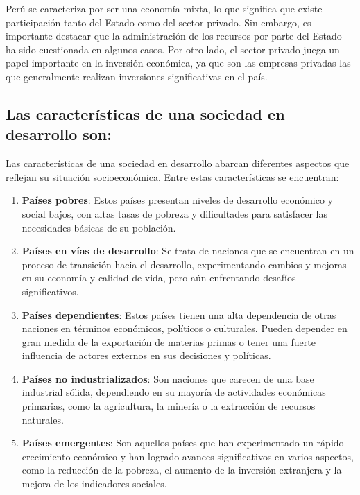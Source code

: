 \documentclass[
  a4paper,
]{article}
\begin{document}
Perú se caracteriza por ser una economía mixta, lo que significa que
existe participación tanto del Estado como del sector privado. Sin
embargo, es importante destacar que la administración de los recursos
por parte del Estado ha sido cuestionada en algunos casos. Por otro
lado, el sector privado juega un papel importante en la inversión
económica, ya que son las empresas privadas las que generalmente
realizan inversiones significativas en el país.

\subsection{Las características de una sociedad en desarrollo
son:}\label{las-caracteruxedsticas-de-una-sociedad-en-desarrollo-son}

Las características de una sociedad en desarrollo abarcan diferentes
aspectos que reflejan su situación socioeconómica. Entre estas
características se encuentran:

\begin{enumerate}
\def\labelenumi{\arabic{enumi}.}
\item
  \textbf{Países pobres}: Estos países presentan niveles de desarrollo
  económico y social bajos, con altas tasas de pobreza y dificultades
  para satisfacer las necesidades básicas de su población.
\item
  \textbf{Países en vías de desarrollo}: Se trata de naciones que se
  encuentran en un proceso de transición hacia el desarrollo,
  experimentando cambios y mejoras en su economía y calidad de vida,
  pero aún enfrentando desafíos significativos.
\item
  \textbf{Países dependientes}: Estos países tienen una alta dependencia
  de otras naciones en términos económicos, políticos o culturales.
  Pueden depender en gran medida de la exportación de materias primas o
  tener una fuerte influencia de actores externos en sus decisiones y
  políticas.
\item
  \textbf{Países no industrializados}: Son naciones que carecen de una
  base industrial sólida, dependiendo en su mayoría de actividades
  económicas primarias, como la agricultura, la minería o la extracción
  de recursos naturales.
\item
  \textbf{Países emergentes}: Son aquellos países que han experimentado
  un rápido crecimiento económico y han logrado avances significativos
  en varios aspectos, como la reducción de la pobreza, el aumento de la
  inversión extranjera y la mejora de los indicadores sociales.
\end{enumerate}
\end{document}
